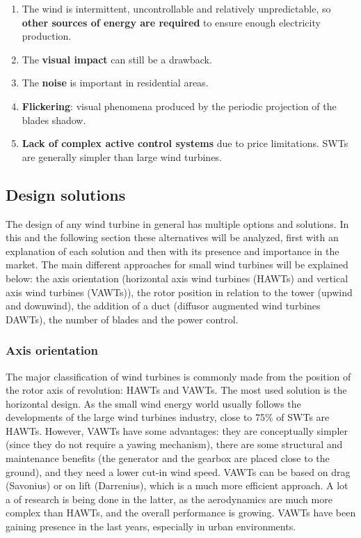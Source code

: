 \documentclass[../TFG_Report.tex]{subfiles}
\begin{document}
\begin{enumerate}
	\item The wind is intermittent, uncontrollable and relatively unpredictable, so \textbf{other sources of energy are required} to ensure enough electricity production.
	
	\item The \textbf{visual impact} can still be a drawback. 
	
	\item The \textbf{noise} is important in residential areas. 
	
	\item \textbf{Flickering}: visual phenomena produced by the periodic projection of the blades shadow. 
	
	\item \textbf{Lack of complex active control systems} due to price limitations. SWTs are generally simpler than large wind turbines. 
	
\end{enumerate}




	
\subsection{Design solutions}

The design of any wind turbine in general has multiple options and solutions. In this and the following section these alternatives will be analyzed, first with an explanation of each solution and then with its presence and importance in the market. The main different approaches for small wind turbines will be explained below: the axis orientation (horizontal axis wind turbines (HAWTs) and vertical axis wind turbines (VAWTs)), the rotor position in relation to the tower (upwind and downwind), the addition of a duct (diffusor augmented wind turbines DAWTs), the number of blades and the power control.   \\

\subsubsection*{Axis orientation}

The major classification of wind turbines is commonly made from the position of the rotor axis of revolution: HAWTs and VAWTs. The most used solution is the horizontal design. As the small wind energy world usually follows the developments of the large wind turbines industry, close to 75\% of SWTs are HAWTs. However, VAWTs have some advantages: they are conceptually simpler (since they do not require a yawing mechanism), there are some structural and maintenance benefits (the generator and the gearbox are placed close to the ground), and they need a lower cut-in wind speed. VAWTs can be based on drag (Savonius) or on lift (Darrenius), which is a much more efficient approach. A lot a of research is being done in the latter, as the aerodynamics are much more complex than HAWTs, and the overall performance is growing. VAWTs have been gaining presence in the last years, especially in urban environments. \cite{Handbook} \cite{DesignControl}
\end{document}
